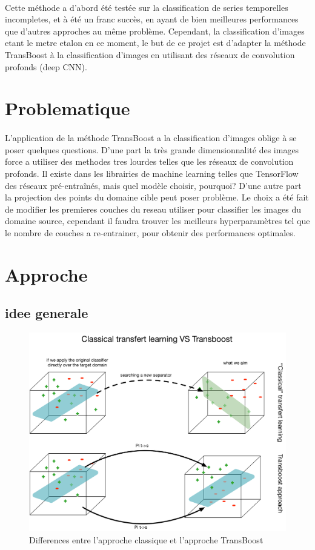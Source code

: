 \documentclass[11 pt]{article}
\begin{document}
\paragraph{}Cette méthode a d’abord été testée sur la classification de series temporelles incompletes, et à été un franc succès, en ayant de bien meilleures performances que d’autres approches au même problème. Cependant, la classification d’images etant le metre etalon en ce moment, le but de ce projet est d’adapter la méthode TransBoost à la classification d’images en utilisant des réseaux de convolution profonds (deep CNN).


\section{Problematique}
\paragraph{}L’application de la méthode TransBoost a la classification d’images oblige à se poser quelques questions. D’une part la très grande dimensionnalité des images force a utiliser des methodes tres lourdes telles que les réseaux de convolution profonds. Il existe dans les librairies de machine learning telles que TensorFlow des réseaux pré-entraînés, mais quel modèle choisir, pourquoi? D’une autre part la projection des points du domaine cible peut poser problème. Le choix a été fait de modifier les premieres couches du reseau utiliser pour classifier les images du domaine source, cependant il faudra trouver les meilleurs hyperparamètres tel que  le nombre de couches a re-entrainer, pour obtenir des performances optimales.

\section{Approche}
\subsection{idee generale}
\begin{figure}
  \includegraphics[width=\textwidth]{fig2.pdf}
  \caption{Differences entre l'approche classique et l'approche TransBoost}
  \label{figDiff}
\end{figure}
\end{document}
